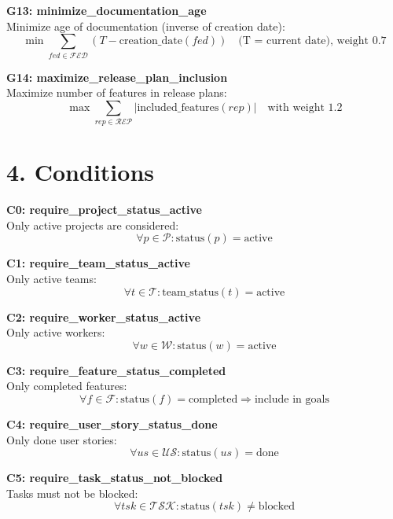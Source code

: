 \documentclass[12pt]{article}
\begin{document}
    \item \textbf{G13: minimize\_documentation\_age} \\
    Minimize age of documentation (inverse of creation date):
    \[
    \min \sum_{fed \in \mathcal{FED}} \left( T - \text{creation\_date}(fed) \right) \quad \text{(T = current date), weight } 0.7
    \]

    \item \textbf{G14: maximize\_release\_plan\_inclusion} \\
    Maximize number of features in release plans:
    \[
    \max \sum_{rep \in \mathcal{REP}} |\text{included\_features}(rep)| \quad \text{with weight } 1.2
    \]

\section{4. Conditions}
\item \textbf{C0: require\_project\_status\_active} \\
    Only active projects are considered:
    \[
    \forall p \in \mathcal{P}: \text{status}(p) = \text{active}
    \]

    \item \textbf{C1: require\_team\_status\_active} \\
    Only active teams:
    \[
    \forall t \in \mathcal{T}: \text{team\_status}(t) = \text{active}
    \]

    \item \textbf{C2: require\_worker\_status\_active} \\
    Only active workers:
    \[
    \forall w \in \mathcal{W}: \text{status}(w) = \text{active}
    \]

    \item \textbf{C3: require\_feature\_status\_completed} \\
    Only completed features:
    \[
    \forall f \in \mathcal{F}: \text{status}(f) = \text{completed} \Rightarrow \text{include in goals}
    \]

    \item \textbf{C4: require\_user\_story\_status\_done} \\
    Only done user stories:
    \[
    \forall us \in \mathcal{US}: \text{status}(us) = \text{done}
    \]

    \item \textbf{C5: require\_task\_status\_not\_blocked} \\
    Tasks must not be blocked:
    \[
    \forall tsk \in \mathcal{TSK}: \text{status}(tsk) \neq \text{blocked}
    \]
\end{document}
